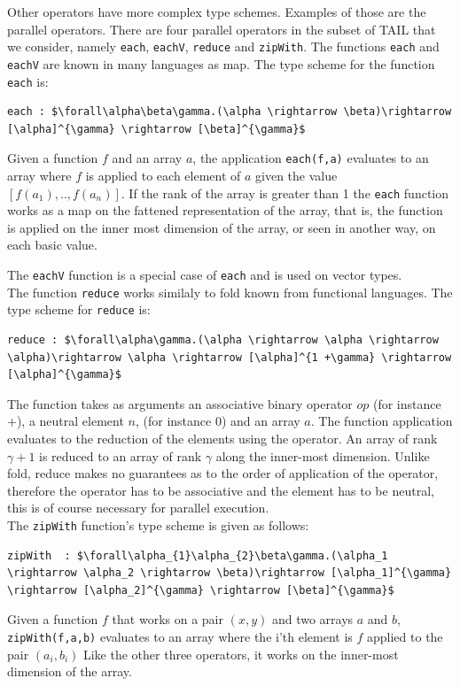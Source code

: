 \documentclass[11pt]{article}
\begin{document}
Other operators have more complex type schemes. Examples of those are the parallel operators. 
There are four parallel operators in the subset of TAIL that we consider, namely {\tt each}, {\tt eachV}, {\tt reduce} and {\tt zipWith}.
The functions {\tt each} and {\tt eachV} are known in many languages as map.
The type scheme for the function {\tt each} is:
\begin{lstlisting}[numbers=none,frame=none]
each : $\forall\alpha\beta\gamma.(\alpha \rightarrow \beta)\rightarrow [\alpha]^{\gamma} \rightarrow [\beta]^{\gamma}$
\end{lstlisting}
Given a function $f$ and an array $a$, the application {\tt each(f,a)} evaluates to an array where $f$ is applied to each element of $a$ given the value $[f(a_1),..,f(a_n)]$.
If the rank of the array is greater than 1 the {\tt each} function works as a map on the fattened representation of the array,
that is, the function is applied on the inner most dimension of the array, or seen in another way, on each basic value.

The {\tt eachV} function is a special case of {\tt each} and is used on vector types.\\

The function {\tt reduce} works similaly to fold known from functional languages. The type scheme for {\tt reduce} is:
\begin{lstlisting}[numbers=none,frame=none]
reduce : $\forall\alpha\gamma.(\alpha \rightarrow \alpha \rightarrow \alpha)\rightarrow \alpha \rightarrow [\alpha]^{1 +\gamma} \rightarrow [\alpha]^{\gamma}$
\end{lstlisting}
The function takes as arguments an associative binary operator $op$ (for instance $+$), a neutral element $n$, (for instance 0) and an array $a$.
The function application evaluates to the reduction of the elements using the operator.
An array of rank $\gamma+1$ is reduced to an array of rank $\gamma$ along the inner-most dimension.
Unlike fold, reduce makes no guarantees as to the order of application of the operator, therefore the operator has to be associative and the element has to be neutral, this is of course necessary for parallel execution.\\

The {\tt zipWith} function's type scheme is given as follows: 
\begin{lstlisting}[numbers=none,frame=none]
zipWith  : $\forall\alpha_{1}\alpha_{2}\beta\gamma.(\alpha_1 \rightarrow \alpha_2 \rightarrow \beta)\rightarrow [\alpha_1]^{\gamma} \rightarrow [\alpha_2]^{\gamma} \rightarrow [\beta]^{\gamma}$
\end{lstlisting}
Given a function $f$ that works on a pair $(x,y)$ and two arrays $a$ and $b$, {\tt zipWith(f,a,b)}  evaluates to an array where the i'th element is $f$ applied to the pair $(a_i,b_i)$ 
Like the other three operators, it works on the inner-most dimension of the array\cite{ElsmanDybdal:Array:2014}.\\
\end{document}

